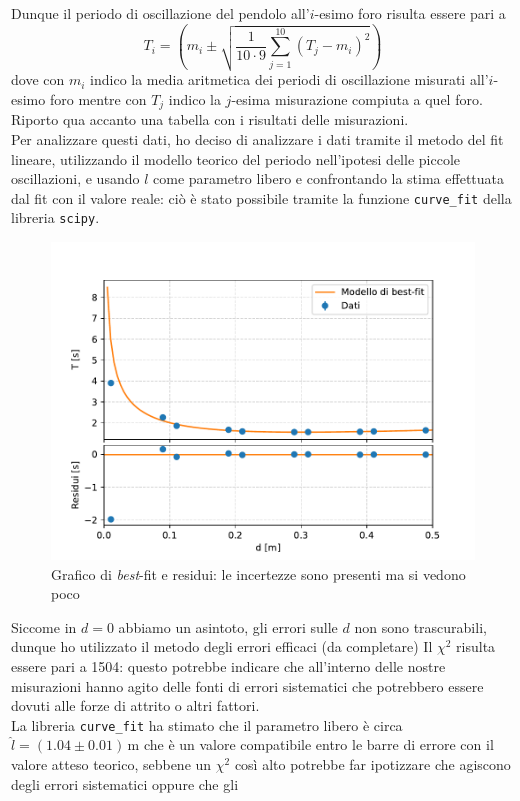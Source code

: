 \documentclass{article}
\begin{document}
\noindent Dunque il periodo di oscillazione del pendolo all'$i$-esimo foro risulta essere pari a
\begin{equation}
	T_i = \left( m_i \pm \sqrt{\frac{1}{10 \cdot 9}\sum_{j=1}^{10} (T_j - m_i)^2 } \right)
\end{equation}
dove con $m_i$ indico la media aritmetica dei periodi di oscillazione misurati all'$i$-esimo foro mentre con $T_j$ indico la $j$-esima misurazione compiuta a quel foro. \\
Riporto qua accanto una tabella con i risultati delle misurazioni. \\
Per analizzare questi dati, ho deciso di analizzare i dati tramite il metodo del fit lineare, utilizzando il modello teorico del periodo nell'ipotesi delle piccole oscillazioni, e usando $l$ come parametro libero e confrontando la stima effettuata dal fit con il valore reale: ciò è stato possibile tramite la funzione \texttt{curve\_fit} della libreria \texttt{scipy}.
\begin{figure}[H]
	\centering
	\includegraphics[scale=0.80]{Fit_e_residui.pdf}
	\caption{Grafico di \emph{best}-fit e residui: le incertezze sono presenti ma si vedono poco}
\end{figure}
Siccome in $d=0$ abbiamo un asintoto, gli errori sulle $d$ non sono trascurabili, dunque ho utilizzato il metodo degli errori efficaci (da completare)
Il $\chi^2$ risulta essere pari a 1504: questo potrebbe indicare che all'interno delle nostre misurazioni hanno agito delle fonti di errori sistematici che potrebbero essere dovuti alle forze di attrito o altri fattori. \\
La libreria \texttt{curve\_fit} ha stimato che il parametro libero è circa $\hat{l} = (1.04 \pm 0.01) \, \si{\meter}$ che è un valore compatibile entro le barre di errore con il valore atteso teorico, sebbene un $\chi^2$ così alto potrebbe far ipotizzare che agiscono degli errori sistematici oppure che gli 
\end{document}
